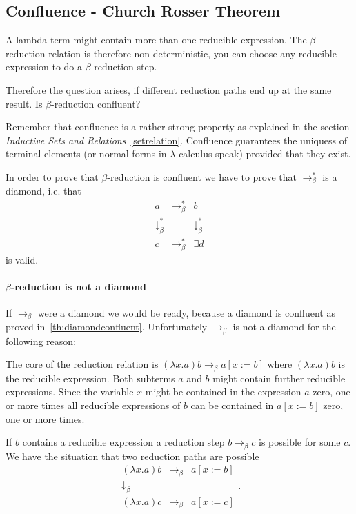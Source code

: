 \subsection{Confluence - Church Rosser Theorem}

A lambda term might contain more than one reducible expression. The
$\beta$-reduction relation is therefore non-deterministic, you can choose any
reducible expression to do a $\beta$-reduction step.

Therefore the question arises, if different reduction paths end up at the same
result. Is $\beta$-reduction confluent?

Remember that confluence is a rather strong property as explained in the
section \emph{Inductive Sets and Relations}~\ref{setrelation}. Confluence
guarantees the uniquess of terminal elements (or normal forms in
$\lambda$-calculus speak) provided that they exist.

In order to prove that $\beta$-reduction is confluent we have to prove that
$\to_\beta^*$ is a diamond, i.e. that
$$\begin{matrix}
  a & \to_\beta^* & b \\
  \downarrow_\beta^* & & \downarrow_\beta^* \\
  c & \to_\beta^* & \exists d
\end{matrix}$$
is valid.


\paragraph{$\beta$-reduction is not a diamond}

If $\to_\beta$ were a diamond we would be ready, because a diamond is
confluent as proved in~\ref{th:diamondconfluent}. Unfortunately $\to_\beta$ is
not a diamond for the following reason:

The core of the reduction relation is $(\lambda x.a) b \to_\beta a[x:=b]$
where $(\lambda x.a) b$ is the reducible expression. Both subterms $a$ and $b$
might contain further reducible expressions. Since the variable $x$ might be
contained in the expression $a$ zero, one or more times all reducible
expressions of $b$ can be contained in $a[x:=b]$ zero, one or more times.

If $b$ contains a reducible expression a reduction step $b \to_\beta c$ is
possible for some $c$. We have the situation that two reduction paths are
possible
$$
\begin{matrix}
  (\lambda x.a) b & \to_\beta & a[x:=b] \\
  \downarrow_\beta & & \\
  (\lambda x.a) c  & \to_\beta & a[x:=c]
\end{matrix}.$$

